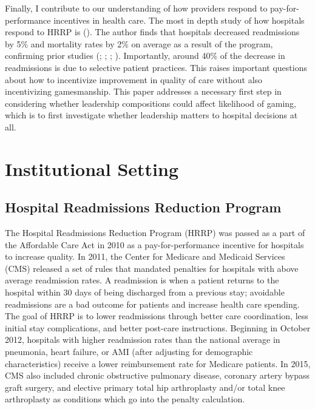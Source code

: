 \documentclass[12pt]{article}
\begin{document}
    Finally, I contribute to our understanding of how providers respond to pay-for-performance incentives in health care. The most in depth study of how hospitals respond to HRRP is \citeauthor{gupta2021impacts} (\citeyear{gupta2021impacts}). The author finds that hospitals decreased readmissions by 5\% and mortality rates by 2\% on average as a result of the program, confirming prior studies (\cite{mellor2017does}; \cite{ziedan2018essays}; \cite{ody2019decreases}; \cite{gupta2021impacts}). Importantly, around 40\% of the decrease in readmissions is due to selective patient practices. This raises important questions about how to incentivize improvement in quality of care without also incentivizing gamesmanship. This paper addresses a necessary first step in considering whether leadership compositions could affect likelihood of gaming, which is to first investigate whether leadership matters to hospital decisions at all. 

    

    \section{Institutional Setting}

    \subsection{Hospital Readmissions Reduction Program}\label{sec:hrrp}

    The Hospital Readmissions Reduction Program (HRRP) was passed as a part of the Affordable Care Act in 2010 as a pay-for-performance incentive for hospitals to increase quality. In 2011, the Center for Medicare and Medicaid Services (CMS) released a set of rules that mandated penalties for hospitals with above average readmission rates. A readmission is when a patient returns to the hospital within 30 days of being discharged from a previous stay; avoidable readmissions are a bad outcome for patients and increase health care spending. The goal of HRRP is to lower readmissions through better care coordination, less initial stay complications, and better post-care instructions. Beginning in October 2012, hospitals with higher readmission rates than the national average in pneumonia, heart failure, or AMI (after adjusting for demographic characteristics) receive a lower reimbursement rate for Medicare patients. In 2015, CMS also included chronic obstructive pulmonary disease, coronary artery bypass graft surgery, and elective primary total hip arthroplasty and/or total knee arthroplasty as conditions which go into the penalty calculation. 
    
\end{document}
